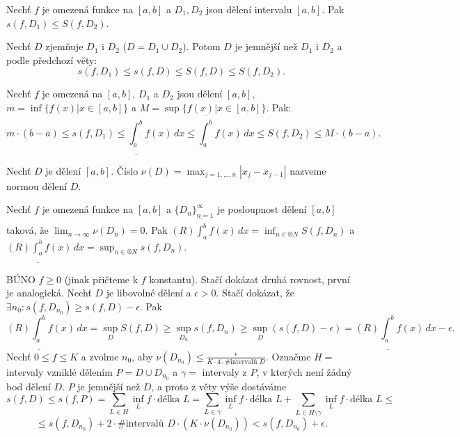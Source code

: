\documentclass[12pt]{article}                   %
\begin{document}
        \begin{veta}
            Nechť $f$ je omezená funkce na $[a, b]$ a $D_1, D_2$ jsou dělení intervalu $[a, b]$. Pak $s(f, D_1) ≤ S(f, D_2)$.

            \begin{dukazin}
                Nechť $D$ zjemňuje $D_1$ i $D_2$ ($D = D_1 \cup D_2$). Potom $D$ je jemnější než $D_1$ i $D_2$ a podle předchozí věty:
                $$ s(f, D_1) ≤ s(f, D) ≤ S(f, D) ≤ S(f, D_2). $$ 
            \end{dukazin}
        \end{veta}

        \begin{dusledek}
            Nechť $f$ je omezená na $[a, b]$, $D_1$ a $D_2$ jsou dělení $[a, b]$, $m = \inf\{f(x) | x \in [a, b]\}$ a $M = \sup\{f(x) | x \in [a, b]\}$. Pak:
            $$ m·(b - a) ≤ s(f, D_1) ≤ \underline{\int_a^b} f(x)\,dx ≤ \overline{\int_a^b} f(x)\,dx ≤ S(f, D_2) ≤ M·(b - a). $$ 
        \end{dusledek}

        \begin{definice}
            Nechť $D$ je dělení $[a, b]$. Číslo $\nu(D) = \max_{j = 1, …, n} |x_j - x_{j-1}|$ nazveme normou dělení $D$.
        \end{definice}

        \begin{veta}
            Nechť $f$ je omezená funkce na $[a, b]$ a $\{D_n\}_{n=1}^∞$ je posloupnost dělení $[a, b]$ taková, že $\lim_{n \rightarrow ∞} \nu(D_n) = 0$. Pak $(R) \overline{\int_a^b} f(x)\,dx = \inf_{n \in ®N} S(f, D_n)$ a $(R) \underline{\int_a^b} f(x)\,dx = \sup_{n \in ®N} s(f, D_n)$.

            \begin{dukazin}
                BÚNO $f ≥ 0$ (jinak přičteme k $f$ konstantu). Stačí dokázat druhá rovnost, první je analogická. Nechť $D$ je libovolné dělení a $\epsilon > 0$. Stačí dokázat, že $\exists n_0: s(f, D_{n_0}) ≥ s(f, D) - \epsilon$. Pak
                $$ (R) \underline{\int_a^b} f(x)\,dx = \sup_D S(f, D) ≥ \sup_{D_n} s(f, D_n) ≥ \sup_D(s(f, D) - \epsilon) = (R) \underline{\int_a^b} f(x)\,dx - \epsilon. $$
                Nechť $0≤ f ≤ K$ a zvolme $n_0$, aby $\nu(D_{n_0}) ≤ \frac{\epsilon}{K·4·\#\text{intervalů } D}$. Označme $H = $ intervaly vzniklé dělením $P = D \cup D_{n_0}$ a $\gamma = $ intervaly z $P$, v kterých není žádný bod dělení $D$. $P$ je jemnější než $D$, a proto z věty výše dostáváme
                $$ s(f, D) ≤ s(f, P) = \sum_{L \in H} \inf_{L}f·\text{délka } L = \sum_{L \in \gamma} \inf_{L}f·\text{délka } L + \sum_{L \in H \setminus \gamma} \inf_{L}f·\text{délka } L ≤ $$
                $$ ≤ s(f, D_{n_0}) + 2·\#\text{intervalů }D·(K·\nu(D_{n_0})) < s(f, D_{n_0}) + \epsilon. $$
            \end{dukazin}
        \end{veta}
\end{document}
